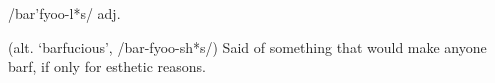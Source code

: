  /bar'fyoo-l*s/ adj.

(alt. `barfucious', /bar-fyoo-sh*s/) Said of something that would make anyone
barf, if only for esthetic reasons.

